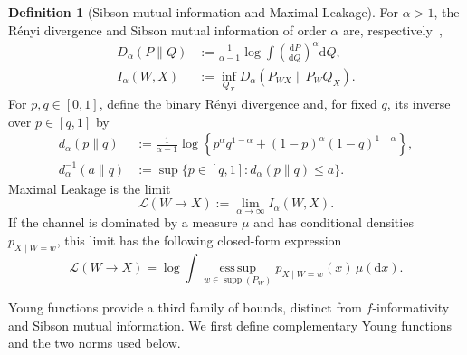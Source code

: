 \documentclass[11pt]{article}
\theoremstyle{definition}
\newtheorem{definition}[theorem]{Definition}
\theoremstyle{remark}
\newcommand{\1}{\boldsymbol{1}}
\newcommand{\ml}[2]{\mathcal{L}(#1\!\to\!#2)}
\begin{document}
\begin{definition}[Sibson mutual information and Maximal Leakage]
For $\alpha>1$, the R\'enyi divergence and Sibson mutual information of order
$\alpha$ are, respectively~\cite{Renyi1961,vanErvenHarremoes2014,Sibson1969,Verdu2015},
\begin{align}
D_\alpha(P\|Q)
&:=
\frac1{\alpha-1}
\log\int
\left(\frac{\mathrm dP}{\mathrm dQ}\right)^\alpha\mathrm dQ,
\\
I_\alpha(W,X)
&:=
\inf_{Q_X}D_\alpha(P_{WX}\|P_WQ_X).
\end{align}
For $p,q\in[0,1]$, define the binary R\'enyi divergence and, for fixed
$q$, its inverse over $p\in[q,1]$ by
\begin{align}
d_\alpha(p\|q)
&:=
\frac1{\alpha-1}
\log\left\{
p^\alpha q^{1-\alpha}
+(1-p)^\alpha(1-q)^{1-\alpha}
\right\},
\\
d_\alpha^{-1}(a\|q)
&:=
\sup\{p\in[q,1]:d_\alpha(p\|q)\leq a\}.
\end{align}
Maximal Leakage is the limit~\cite{IssaWagnerKamath2020}
\begin{equation}
\ml{W}{X}
:=
\lim_{\alpha\to\infty}I_\alpha(W,X).
\label{eq:maximalLeakageDefinition}
\end{equation}
If the channel is dominated by a measure $\mu$ and has conditional
densities $p_{X\mid W=w}$, this limit has the following closed-form expression~\cite{IssaWagnerKamath2020}
\begin{equation}
\ml{W}{X}
=
\log\int
\operatorname*{ess\,sup}_{w\in\operatorname{supp}(P_W)}
p_{X\mid W=w}(x)\,\mu(\mathrm dx).
\label{eq:maximalLeakageIntegralDefinition}
\end{equation}
\end{definition}
Young functions provide a third family of bounds, distinct from
\(f\)-informativity and Sibson mutual information. We first define complementary
Young functions and the two norms used below.
\end{document}
